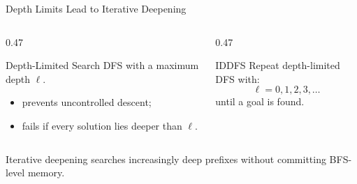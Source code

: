 \documentclass[aspectratio=169,10pt]{beamer}
\begin{document}
\begin{frame}[shrink=20]{Depth Limits Lead to Iterative Deepening}
  \begin{columns}[T,onlytextwidth]
    \begin{column}{0.47\textwidth}
      \begin{block}{Depth-Limited Search}
        DFS with a maximum depth $\ell$.
        \begin{itemize}
          \item prevents uncontrolled descent;
          \item fails if every solution lies deeper than $\ell$.
        \end{itemize}
      \end{block}
    \end{column}

    \begin{column}{0.47\textwidth}
      \begin{block}{IDDFS}
        Repeat depth-limited DFS with:
        \[
          \ell = 0,1,2,3,\ldots
        \]
        until a goal is found.
      \end{block}
    \end{column}
  \end{columns}

  \begin{keyidea}
    Iterative deepening searches increasingly deep prefixes without committing BFS-level memory.
  \end{keyidea}
\end{frame}
\end{document}
